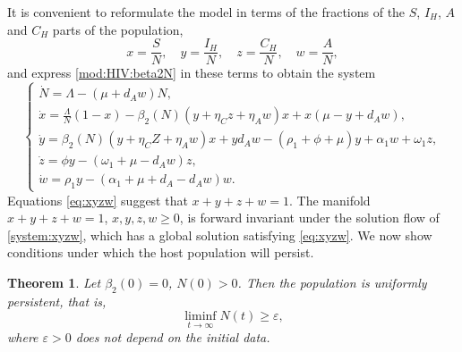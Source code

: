 \documentclass{my_aims}
\newtheorem{theorem}{Theorem}[section]
\theoremstyle{definition}
\begin{document}
It is convenient to reformulate the model in terms of the fractions
of the $S$, $I_H$, $A$ and $C_H$ parts of the population,
\begin{equation}
\label{eq:xyzw}
x = \frac{S}{N}, \quad y = \frac{I_H}{N},
\quad z = \frac{C_H}{N}, \quad w = \frac{A}{N},
\end{equation}
and express \eqref{mod:HIV:beta2N} in these terms to obtain the system
\begin{equation}
\label{system:xyzw}
\begin{cases}
\dot{N} =  \Lambda - (\mu + d_A w) N ,\\[0.2 cm]
\dot{x} = \frac{\Lambda}{N}(1-x) - \beta_2(N) (y + \eta_C z
+ \eta_A w)x + x(\mu - y + d_A w) ,\\[0.2 cm]
\dot{y} =  \beta_2(N)(y+ \eta_C Z + \eta_A w)x + y d_A w
- \left(\rho_1 + \phi + \mu\right)y + \alpha_1 w + \omega_1 z,\\[0.2 cm]
\dot{z} = \phi y - (\omega_1 + \mu - d_A w)z,\\[0.2 cm]
\dot{w} = \rho_1 y - (\alpha_1 + \mu + d_A - d_A w) w.
\end{cases}
\end{equation}
Equations \eqref{eq:xyzw} suggest that $x + y + z + w = 1$.
The manifold $x + y + z + w= 1$, $x, y, z, w \ge 0$, is forward invariant
under the solution flow of \eqref{system:xyzw}, which has a global solution satisfying
\eqref{eq:xyzw}. We now show conditions under which the host population will persist.

\begin{theorem}
\label{theo:persistence}
Let $\beta_2(0) = 0$, $N(0) > 0$. Then the population
is uniformly persistent, that is,
$$
\liminf_{t \to \infty} N(t) \geq \varepsilon,
$$
where $\varepsilon > 0$ does not depend on the initial data.
\end{theorem}
\end{document}
